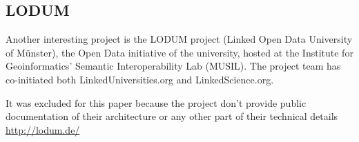 \subsection{LODUM}

Another interesting project is the LODUM project (Linked Open Data University of Münster), the Open Data initiative of the university, hosted at the Institute for Geoinformatics' Semantic Interoperability Lab (MUSIL). The project team has co-initiated both LinkedUniversities.org and LinkedScience.org.

It was excluded for this paper because the project don't provide public documentation of their architecture or any other part of their technical details
\url{http://lodum.de/}
